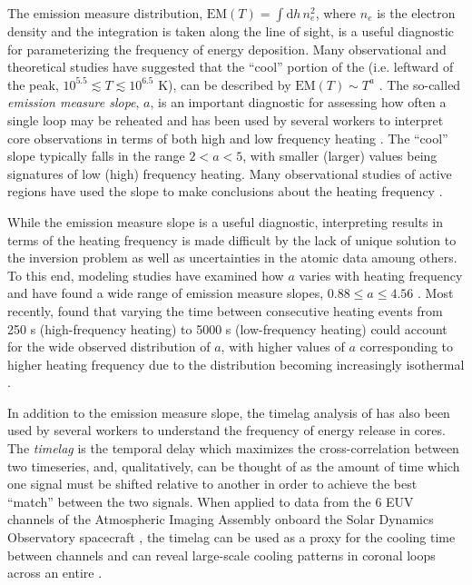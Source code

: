 The emission measure distribution, $\mathrm{EM}(T)=\int\mathrm{d}h\,n_e^2$, where $n_e$ is the electron density and the integration is taken along the line of sight, is a useful diagnostic for parameterizing the frequency of energy deposition. Many observational and theoretical studies have suggested that the ``cool'' portion of the \dem{} (i.e. leftward of the peak, $10^{5.5}\lesssim T\lesssim10^{6.5}$ K), can be described by $\mathrm{EM}(T)\sim T^a$ \citep{jordan_structure_1976,cargill_implications_1994,cargill_nanoflare_2004}. The so-called \textit{emission measure slope}, $a$, is an important diagnostic for assessing how often a single loop may be reheated and has been used by several workers to interpret \AR{} core observations in terms of both high and low frequency heating \citep[see Table 3 of][and references therin]{bradshaw_diagnosing_2012}. The ``cool'' \dem{} slope typically falls in the range $2<a<5$, with smaller (larger) values being signatures of low (high) frequency heating. Many observational studies of active regions have used the \dem{} slope to make conclusions about the heating frequency \citep{tripathi_emission_2011,warren_constraints_2011,winebarger_using_2011,schmelz_cold_2012,warren_systematic_2012,del_zanna_evolution_2015}.

While the emission measure slope is a useful diagnostic, interpreting results in terms of the heating frequency is made difficult by the lack of unique solution to the \dem{} inversion problem \citet[see][]{aschwanden_benchmark_2015} as well as uncertainties in the atomic data amoung others. To this end, modeling studies have examined how $a$ varies with heating frequency and have found a wide range of emission measure slopes, $0.88\le a\le4.56$ \citep{mulu-moore_can_2011,bradshaw_diagnosing_2012,reep_diagnosing_2013}. Most recently, \citet{cargill_active_2014} found that varying the time between consecutive heating events from 250 s (high-frequency heating) to 5000 s (low-frequency heating) could account for the wide observed distribution of $a$, with higher values of $a$ corresponding to higher heating frequency due to the \dem{} distribution becoming increasingly isothermal \citep[see also][]{barnes_inference_2016-1}.

In addition to the emission measure slope, the timelag analysis of \citet{viall_evidence_2012} has also been used by several workers to understand the frequency of energy release in \AR{} cores. The \textit{timelag} is the temporal delay which maximizes the cross-correlation between two timeseries, and, qualitatively, can be thought of as the amount of time which one signal must be shifted relative to another in order to achieve the best ``match'' between the two signals. When applied to data from the 6 EUV channels of the Atmospheric Imaging Assembly \citep[AIA,][]{lemen_atmospheric_2012} onboard the Solar Dynamics Observatory spacecraft \citep[SDO,][]{pesnell_solar_2012}, the timelag can be used as a proxy for the cooling time between channels and can reveal large-scale cooling patterns in coronal loops across an entire \AR{}. 

